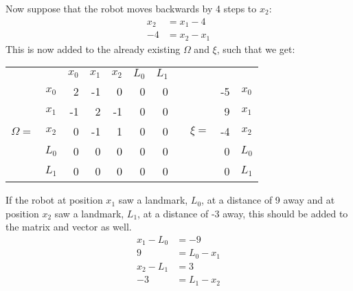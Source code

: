 \noindent Now suppose that the robot moves backwards by 4 steps to $x_2$:
\begin{align*}
x_2 &= x_1 - 4\\
-4  &= x_2 - x_1
\end{align*}
This is now added to the already existing $\Omega$ and $\xi$, such that we get:
\begin{table}[!h]
    \centering
    \begin{tabular}{cc|rrrrr c crc}
        &       & $x_0$ & $x_1$ & $x_2$ & $L_0$ & $L_1$ & 
        
        \qquad &        &                        & \\
        
        \cline{2-7}
        & $x_0$ &   2   &  -1   &  0    &  0    &   0   &  
        
        &        &\multicolumn{1}{r|}{-5} & $x_0$\\
        
        & $x_1$ &  -1   &   2   &  -1    &  0    &   0   &  
        
        &        & \multicolumn{1}{r|}{9} & $x_1$\\
        
        $\Omega=$ & $x_2$ &   0   &   -1   &  1    &  0    &   0   &  
        
        & $\xi=$ &\multicolumn{1}{r|}{-4} & $x_2$\\
        
        & $L_0$ &   0   &   0   &  0    &  0    &   0   &  
        
        &        & \multicolumn{1}{r|}{0} & $L_0$\\
        
        & $L_1$ &   0   &   0   &  0    &  0    &   0   &  
        
        &        & \multicolumn{1}{r|}{0} & $L_1$\\
    \end{tabular}                                               
\end{table}

\noindent If the robot at position $x_1$ saw a landmark, $L_0$, at a distance of 9 away and at position $x_2$ saw a landmark, $L_1$, at a distance of -3 away,  this should be added to the matrix and vector as well.
\begin{align*}
x_1 - L_0 &= -9\\
9  &= L_0 - x_1\\
x_2 - L_1 &= 3\\
-3  &= L_1 - x_2
\end{align*}

